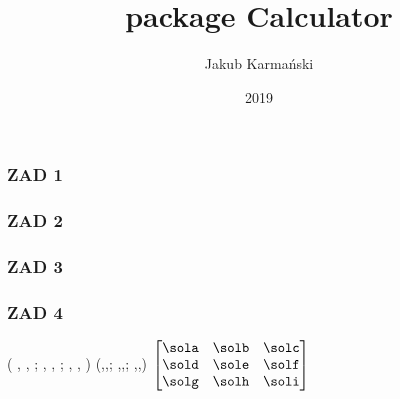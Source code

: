 \documentclass{beamer}
\title{package Calculator}
\author{Jakub Karmański}
\institute{POLSL RMS rok III sem.V}
\date{2019}
\begin{document}
 
\frame{\titlepage}
 
\begin{frame}
\frametitle{ZAD 1}

\potega
 
\end{frame}

\begin{frame}
\frametitle{ZAD 2}

 \SIN{\numberSIXTHPI}{\sinn}
 \COS{\numberFIFTHPI}{\coss}
 \MULTIPLY{\sinn}{\coss}{\mnozenie}
 \ROUND[2]{\mnozenie}{\zaokraglenie} 
\zaokraglenie

\end{frame}

\begin{frame}
\frametitle{ZAD 3}

 \SUBTRACT{\numberFIFTHPI}{\szescian}{\dzielenie} 
 \ABSVALUE{\dzielenie}{\bezw} 
\bezw

\end{frame}

\begin{frame}
\frametitle{ZAD 4}

 \SUBTRACT{\numberFIFTHPI}{\szescian}{\dzielenie} 
 \ABSVALUE{\dzielenie}{\bezw} 
 \SIN{\numberSIXTHPI}{\sinn}
 \COS{\numberFIFTHPI}{\coss}
 \MULTIPLY{\sinn}{\coss}{\mnozenie}
 \ROUND[2]{\mnozenie}{\zaokraglenie} 


\MATRIXCOPY( \sinn , \bezw , \coss ;
\dzielenie, \mnozenie , \zaokraglenie;
\szescian , \dodaj, \odejmij)%
(\sola,\solb,\solc;
\sold,\sole,\solf;
\solg,\solh,\soli)
$\begin{bmatrix}
\sola & \solb & \solc \\
\sold & \sole & \solf \\
\solg & \solh & \soli
\end{bmatrix}$



\end{frame}
 
\end{document}
